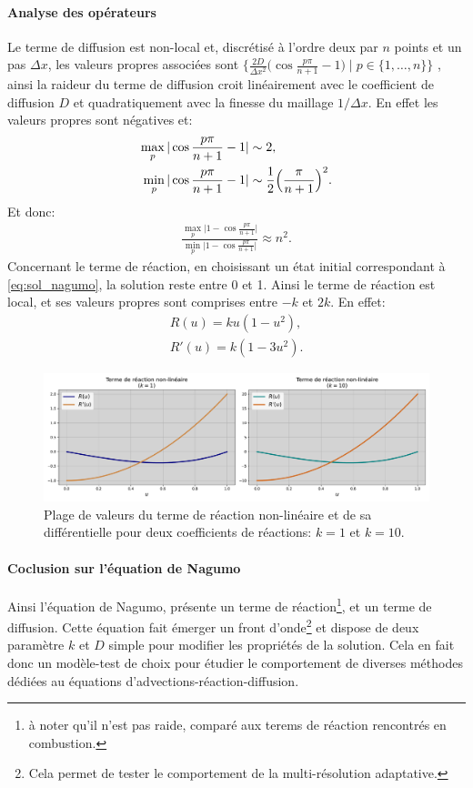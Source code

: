 \paragraph{Analyse des opérateurs}
Le terme de diffusion est non-local et, discrétisé à l'ordre deux par $n$ points et un pas $\Delta x$, les valeurs propres associées sont 
$\{ \frac{2D}{\Delta x^2} \bigl(\cos \frac{p\pi}{n+1} - 1\bigr) \mid p \in \{1,\dots,n\}\}$ \cite{bouchet2020laplacien}, 
ainsi la raideur du terme de diffusion croit linéairement avec le coefficient de diffusion $D$ et quadratiquement avec la finesse du maillage $1/\Delta x$.
En effet les valeurs propres sont négatives et:
\begin{align}
    \max_p \vert\cos \frac{p\pi}{n+1} - 1 \vert &\sim 2,\\
    \min_p \vert \cos \frac{p\pi}{n+1} - 1 \vert &\sim \frac{1}{2}\Bigl( \frac{\pi}{n+1} \Bigr)^2.
\end{align}
Et donc:
\begin{align}
    \frac{\max_p \vert 1 - \cos \frac{p\pi}{n+1} \vert}{\min_p \vert 1 - \cos \frac{p\pi}{n+1} \vert} \approx n^2.
\end{align}
Concernant le terme de réaction, en choisissant un état initial correspondant à \ref{eq:sol_nagumo},
la solution reste entre 0 et 1. Ainsi le terme de réaction est local, et ses valeurs propres sont comprises entre $-k$ et $2k$.
En effet: 
\begin{align}
    R(u) = ku(1-u^2),\\
    R'(u) = k (1 - 3u^2).
\end{align}

\begin{figure}[htbp]
    \centering
    \includegraphics[width=\textwidth]{media/4_travail/2_nagumo/raideur_reaction_nagumo.pdf}
    \caption{Plage de valeurs du terme de réaction non-linéaire et de sa différentielle pour deux coefficients de réactions: $k=1$ et $k=10$.}
    \label{fig:raideur_reaction_nagumo}
\end{figure}

\paragraph{Coclusion sur l'équation de Nagumo}
Ainsi l'équation de Nagumo, présente un terme de réaction\footnote{à noter qu'il n'est pas raide, comparé aux terems de réaction rencontrés en combustion.},
et un terme de diffusion. Cette équation fait émerger un front d'onde\footnote{Cela permet de tester le comportement de la multi-résolution adaptative.} et dispose de deux paramètre $k$ et $D$ simple pour modifier les propriétés de la solution. 
Cela en fait donc un modèle-test de choix pour étudier le comportement de diverses méthodes dédiées au équations d'advections-réaction-diffusion. 